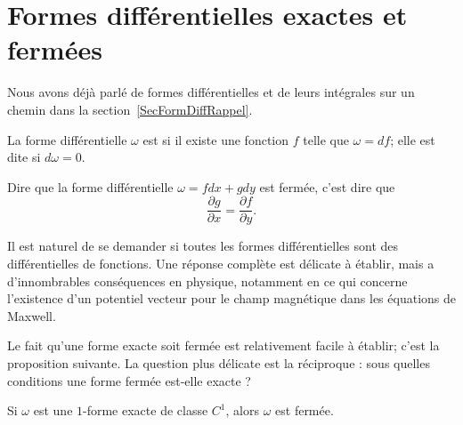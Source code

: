 
\section{Formes différentielles exactes et fermées}

Nous avons déjà parlé de formes différentielles et de leurs intégrales sur un chemin dans la section~\ref{SecFormDiffRappel}.

\begin{definition}  \label{DefEFKQmPs}
	La forme différentielle \( \omega\) est  si il existe une fonction \( f\) telle que \( \omega=df\); elle est dite  si \( d\omega=0\).
\end{definition}

Dire que la forme différentielle \( \omega=fdx+gdy\) est fermée, c'est dire que
\begin{equation}
	\frac{ \partial g }{ \partial x }=\frac{ \partial f }{ \partial y }.
\end{equation}

Il est naturel de se demander si toutes les formes différentielles sont des différentielles de fonctions. Une réponse complète est délicate à établir, mais a d'innombrables conséquences en physique, notamment en ce qui concerne l'existence d'un potentiel vecteur pour le champ magnétique dans les équations de Maxwell.

Le fait qu'une forme exacte soit fermée est relativement facile à établir; c'est la proposition suivante. La question plus délicate est la réciproque : sous quelles conditions une forme fermée est-elle exacte ?
\begin{proposition}
	Si \( \omega\) est une \( 1\)-forme exacte de classe \( C^1\), alors \( \omega\) est fermée.
\end{proposition}

